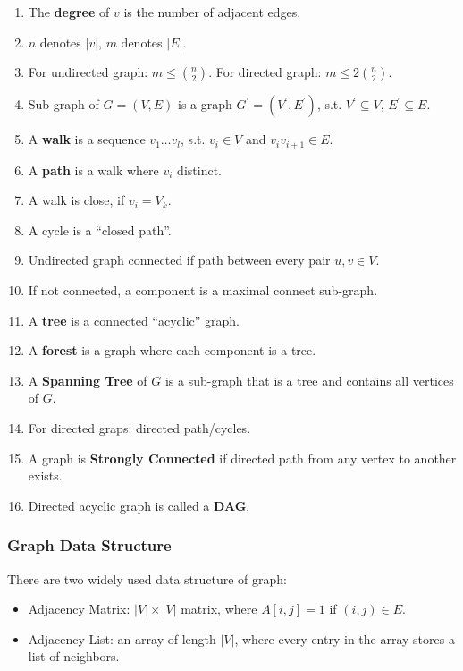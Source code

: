 \begin{enumerate}
    \item The \textbf{degree} of $v$ is the number of adjacent edges.
    \item $n$ denotes $|v|$, $m$ denotes $|E|$.
    \item For undirected graph: $\displaystyle m \leq \binom{n}{2}$.
        For directed graph: $\displaystyle m \leq 2 \binom{n}{2}$.
    \item Sub-graph of $G=(V,E)$ is a graph $G^\prime = (V^\prime, E^\prime)$,
        s.t. $V^\prime \subseteq V$, $E^\prime \subseteq E$.
    \item A \textbf{walk} is a sequence $v_1\ldots v_l$,
        s.t. $v_i \in V$ and $v_iv_{i+1} \in E$.
    \item A \textbf{path} is a walk where $v_i$ distinct.
    \item A walk is close, if $v_i = V_k$.
    \item A cycle is a ``closed path''.
    \item Undirected graph connected if path between every pair $u,v \in V$.
    \item If not connected, a component is a maximal connect sub-graph.
    \item A \textbf{tree} is a connected ``acyclic'' graph.
    \item A \textbf{forest} is a graph where each component is a tree.
    \item A \textbf{Spanning Tree} of $G$ is a sub-graph that is a tree
        and contains all vertices of $G$.
    \item For directed graps: directed path/cycles.
    \item A graph is \textbf{Strongly Connected} if directed path
        from any vertex to another exists.
    \item Directed acyclic graph is called a \textbf{DAG}.
\end{enumerate}

\subsubsection{Graph Data Structure}
There are two widely used data structure of graph:
\begin{itemize}
    \item Adjacency Matrix: $|V| \times |V|$ matrix, where $A[i,j] = 1$
        if $(i,j) \in E$.
    \item Adjacency List: an array of length $|V|$, where
        every entry in the array stores a list of neighbors.
\end{itemize}

